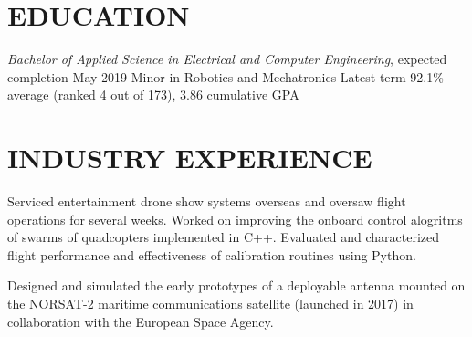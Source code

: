 \documentclass{ResumeTemplate}
\begin{document}
	
	
	
	\section{EDUCATION}
	\workitemsthree
	{{\textit{Bachelor of Applied Science in Electrical and Computer Engineering}, expected completion May 2019}}
	{Minor in Robotics and Mechatronics}
	{Latest term 92.1\% average (ranked 4 out of 173), 3.86 cumulative GPA}
	
	\section{INDUSTRY EXPERIENCE}
	

	\workitemsthree
	{Serviced entertainment drone show systems overseas and oversaw flight operations for several weeks.}
	{Worked on improving the onboard control alogritms of swarms of quadcopters implemented in C++.}
	{Evaluated and characterized flight performance and effectiveness of calibration routines using Python.}
	

	\workitemsone
	{Designed and simulated the early prototypes of a deployable antenna mounted on the NORSAT-2 maritime communications satellite (launched in 2017) in collaboration with the European Space Agency.}
	
\end{document}
